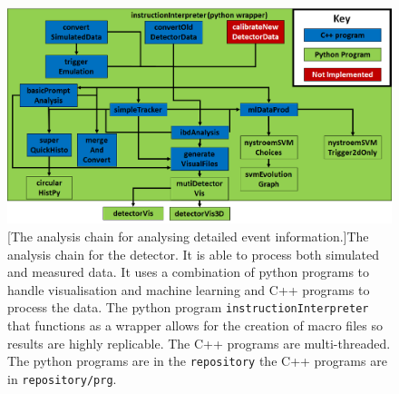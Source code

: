 \begin{figure}[!h]
 \centering
 \includegraphics[width=\linewidth]{Chapter5/Figs/Raster/analysisChainRevisedAgain.png}
 [The analysis chain for analysing detailed event information.]{The analysis chain for the detector. It is able to process both simulated and measured data. It uses a combination of python programs to handle visualisation and machine learning and C++ programs to process the data. The python program \texttt{instructionInterpreter} that functions as a wrapper allows for the creation of macro files so results are highly replicable. The C++ programs are multi-threaded. The python programs are in the \texttt{repository} the C++ programs are in \texttt{repository/prg}.} 
 \label{fig:analysisChain}
\end{figure}